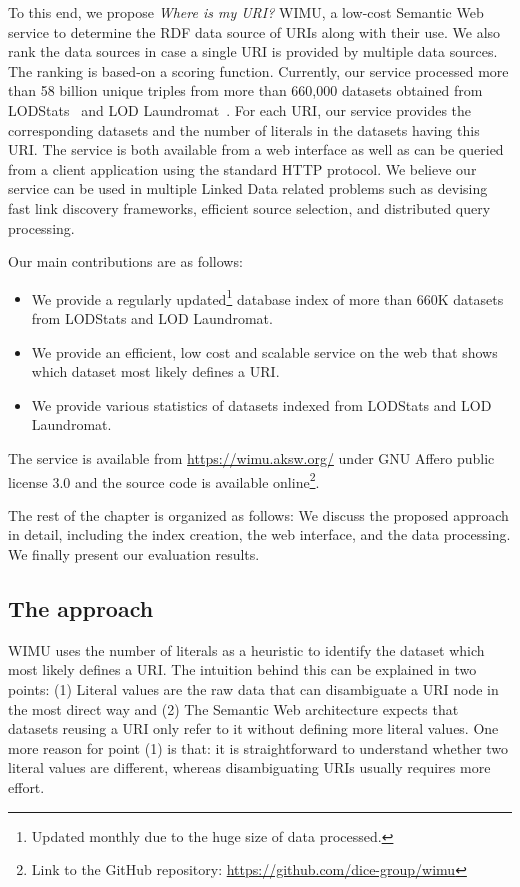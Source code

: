 To this end, we propose \textit{Where is my URI?} \ac{WIMU}, a low-cost Semantic Web service to determine the RDF data source of URIs along with their use. 
We also rank the data sources in case a single URI is provided by multiple data sources. The ranking is based-on a scoring function. 
Currently, our service processed more than 58 billion unique triples from more than 660,000 datasets obtained from LODStats~\cite{auer2012lodstats} and LOD Laundromat~\cite{beek2014lod}. 
For each URI, our service provides the corresponding datasets and the number of literals in the datasets having this URI. 
The service is both available from a web interface as well as can be queried from a client application using the standard HTTP protocol. 
We believe our service can be used in multiple Linked Data related problems such as devising fast link discovery frameworks, efficient source selection, and distributed query processing.

Our main contributions are as follows:
\begin{itemize}
    \item We provide a regularly updated\footnote{Updated monthly due to the huge size of data processed.} database index of more than 660K datasets from LODStats and LOD Laundromat. 
    \item We provide an efficient, low cost and scalable service on the web that shows which dataset most likely defines a URI. 
    \item We provide various statistics of datasets indexed from LODStats and LOD Laundromat.
\end{itemize}
The service is available from \url{https://wimu.aksw.org/} under GNU Affero public license 3.0 and the source code is available online\footnote{Link to the GitHub repository: \url{https://github.com/dice-group/wimu}}.

The rest of the chapter is organized as follows: 
We discuss the proposed approach in detail, including the index creation, the web interface, and the data processing. 
We finally present our evaluation results.

\subsection{The approach}

WIMU uses the number of literals as a heuristic to identify the dataset which most likely defines a URI.
The intuition behind this can be explained in two points: 
(1) Literal values are the raw data that can disambiguate a URI node in the most direct way and 
(2) The Semantic Web architecture expects that datasets reusing a URI only refer to it without defining more literal values. 
One more reason for point (1) is that: it is straightforward to understand whether two literal values are different, whereas disambiguating URIs usually requires more effort.

